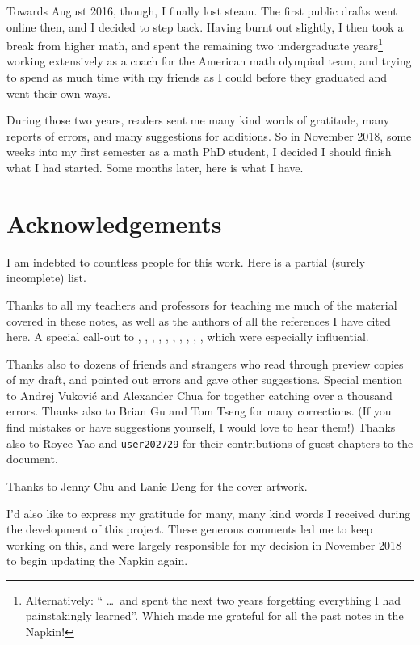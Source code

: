 Towards August 2016, though, I finally lost steam.
The first public drafts went online then, and I decided to step back.
Having burnt out slightly,
I then took a break from higher math,
and spent the remaining two undergraduate years\footnote{Alternatively:
	`` \dots\ and spent the next two years forgetting everything
	I had painstakingly learned''.
	Which made me grateful for all the past notes in the Napkin!}
working extensively as a coach for the American math olympiad team,
and trying to spend as much time with my friends as I could
before they graduated and went their own ways.

During those two years, readers sent me many kind words of gratitude,
many reports of errors, and many suggestions for additions.
So in November 2018,
some weeks into my first semester as a math PhD student,
I decided I should finish what I had started.
Some months later, here is what I have.

\section*{Acknowledgements}
I am indebted to countless people for this work.
Here is a partial (surely incomplete) list.

\begin{itemize}
\ii Thanks to all my teachers and professors for teaching me much of the
material covered in these notes,
as well as the authors of all the references I have cited here.
A special call-out to \cite{ref:55a}, \cite{ref:msci},
\cite{ref:manifolds}, \cite{ref:gathmann}, \cite{ref:18-435},
\cite{ref:etingof}, \cite{ref:145a}, \cite{ref:vakil},
\cite{ref:pugh}, \cite{ref:gorin},
which were especially influential.

\ii Thanks also to dozens of friends and strangers
who read through preview copies of my draft,
and pointed out errors and gave other suggestions.
Special mention to Andrej Vukovi\'c and Alexander Chua
for together catching over a thousand errors.
Thanks also to Brian Gu and Tom Tseng for many corrections.
(If you find mistakes or have suggestions yourself, I would love to hear them!)
Thanks also to Royce Yao and \texttt{user202729}
for their contributions of guest chapters to the document.

\ii Thanks to Jenny Chu and Lanie Deng for the cover artwork.

\ii I'd also like to express my gratitude for
many, many kind words I received
during the development of this project.
These generous comments led me to keep working on this,
and were largely responsible for my decision in November 2018
to begin updating the Napkin again.
\end{itemize}

